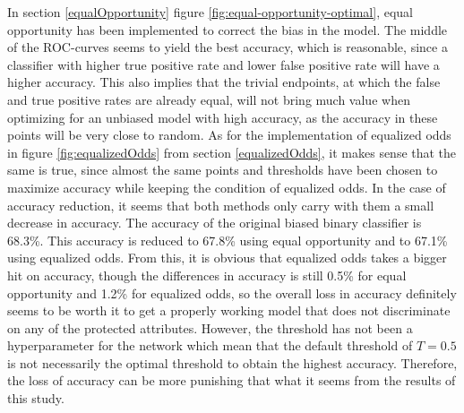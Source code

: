 \documentclass[11pt, fleqn, titlepage]{article}
\begin{document}
	In section \ref{equalOpportunity} figure \ref{fig:equal-opportunity-optimal}, equal opportunity has been implemented to correct the bias in the model. The middle of the ROC-curves seems to yield the best accuracy, which is reasonable, since a classifier with higher true positive rate and lower false positive rate will have a higher accuracy. This also implies that the trivial endpoints, at which the false and true positive rates are already equal, will not bring much value when optimizing for an unbiased model with high accuracy, as the accuracy in these points will be very close to random. As for the implementation of equalized odds in figure \ref{fig:equalizedOdds} from section \ref{equalizedOdds}, it makes sense that the same is true, since almost the same points and thresholds have been chosen to maximize accuracy while keeping the condition of equalized odds. In the case of accuracy reduction, it seems that both methods only carry with them a small decrease in accuracy. The accuracy of the original biased binary classifier is 68.3\%. This accuracy is reduced to 67.8\% using equal opportunity and to 67.1\% using equalized odds. From this, it is obvious that equalized odds takes a bigger hit on accuracy, though the differences in accuracy is still 0.5\% for equal opportunity and 1.2\% for equalized odds, so the overall loss in accuracy definitely seems to be worth it to get a properly working model that does not discriminate on any of the protected attributes. However, the threshold has not been a hyperparameter for the network which mean that the default threshold of $ T = 0.5 $ is not necessarily the optimal threshold to obtain the highest accuracy. Therefore, the loss of accuracy can be more punishing that what it seems from the results of this study.
	
\end{document}
